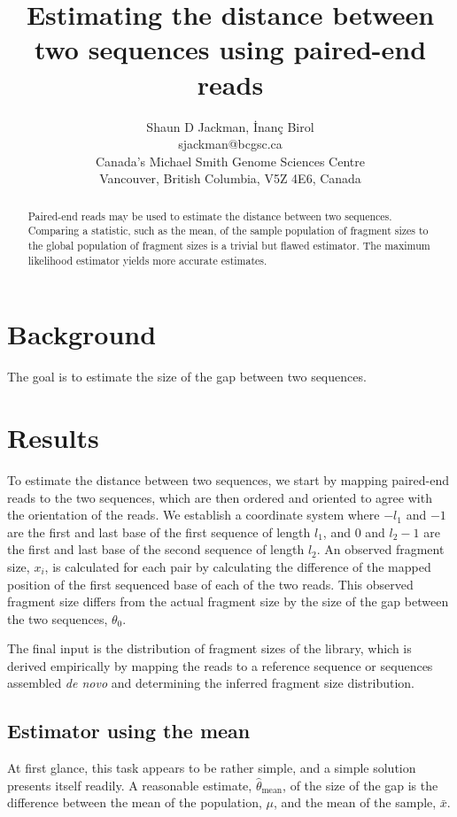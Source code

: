 \documentclass[letterpaper,12pt]{article}
\title{Estimating the distance between two sequences using paired-end reads}
\author{Shaun D Jackman, İnanç Birol \\ sjackman@bcgsc.ca \\
Canada's Michael Smith Genome Sciences Centre \\
Vancouver, British Columbia, V5Z 4E6, Canada
}
\begin{document}
\maketitle

\begin{abstract}
Paired-end reads may be used to estimate the distance between two
sequences. Comparing a statistic, such as the mean, of the sample
population of fragment sizes to the global population of fragment
sizes is a trivial but flawed estimator. The maximum likelihood
estimator yields more accurate estimates.
\end{abstract}

\section*{Background}

The goal is to estimate the size of the gap between two sequences.

\section*{Results}

To estimate the distance between two sequences, we start by mapping
paired-end reads to the two sequences, which are then ordered and
oriented to agree with the orientation of the reads. We establish a
coordinate system where $-l_1$ and $-1$ are the first and last base of
the first sequence of length $l_1$, and $0$ and $l_2-1$ are the first
and last base of the second sequence of length $l_2$.  An observed
fragment size, $x_i$, is calculated for each pair by calculating the
difference of the mapped position of the first sequenced base of each
of the two reads. This observed fragment size differs from the actual
fragment size by the size of the gap between the two sequences,
$\theta_0$.

The final input is the distribution of fragment sizes of the library,
which is derived empirically by mapping the reads to a reference
sequence or sequences assembled \textit{de novo} and determining the
inferred fragment size distribution.

\subsection*{Estimator using the mean}
At first glance, this task appears to be rather simple, and a simple
solution presents itself readily. A reasonable estimate, $\hat
\theta_\text{mean}$, of the size of the gap is the difference between
the mean of the population, $\mu$, and the mean of the sample,
$\bar x$.
\end{document}
